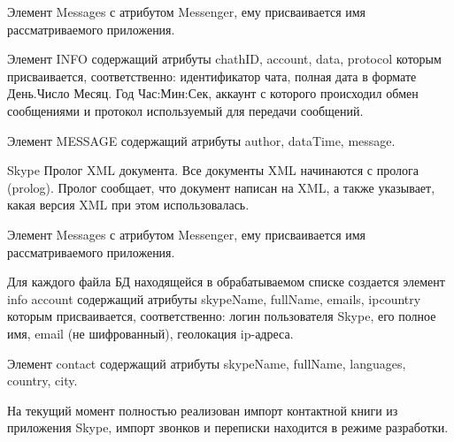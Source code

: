 Элемент Messages с атрибутом Messenger, ему присваивается имя рассматриваемого приложения.

Элемент INFO содержащий атрибуты chathID, account, data, protocol которым присваивается, соответственно: идентификатор чата, полная дата в формате День.Число Месяц. Год Час:Мин:Сек, аккаунт с которого происходил обмен сообщениями и протокол используемый для передачи сообщений. 

Элемент MESSAGE содержащий атрибуты author, dataTime, message.

Skype
Пролог XML документа. Все документы XML начинаются с пролога (prolog). Пролог сообщает, что документ написан на XML, а также указывает, какая версия XML при этом использовалась.  

Элемент Messages с атрибутом Messenger, ему присваивается имя рассматриваемого приложения.

Для каждого файла БД находящейся в обрабатываемом списке создается элемент info account содержащий атрибуты skypeName, fullName, emails, ipcountry которым присваивается, соответственно: логин пользователя Skype, его полное имя, email (не шифрованный), геолокация ip-адреса.  

Элемент contact содержащий атрибуты skypeName, fullName, languages, country, city.
  
На текущий момент полностью реализован импорт контактной книги из приложения Skype, импорт звонков и переписки находится в режиме разработки.
